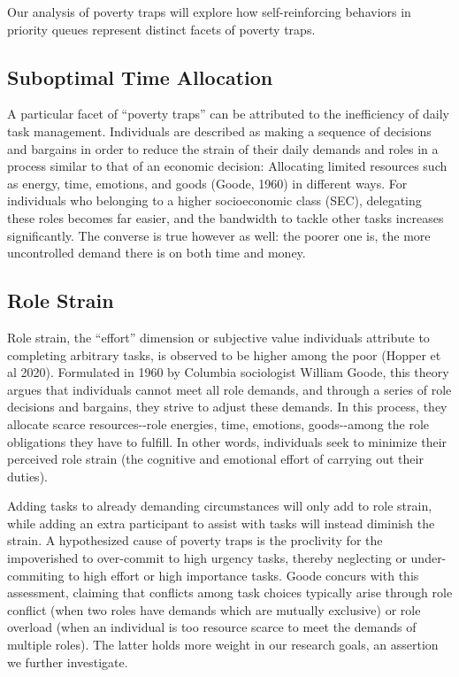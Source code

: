 \documentclass[
]{report}
\begin{document}
Our analysis of poverty traps will explore how self-reinforcing
behaviors in priority queues represent distinct facets of poverty traps.

\hypertarget{suboptimal-time-allocation}{%
\subsection{Suboptimal Time
Allocation}\label{suboptimal-time-allocation}}

A particular facet of ``poverty traps'' can be attributed to the
inefficiency of daily task management. Individuals are described as
making a sequence of decisions and bargains in order to reduce the
strain of their daily demands and roles in a process similar to that of
an economic decision: Allocating limited resources such as energy, time,
emotions, and goods (Goode, 1960) in different ways. For individuals who
belonging to a higher socioeconomic class (SEC), delegating these roles
becomes far easier, and the bandwidth to tackle other tasks increases
significantly. The converse is true however as well: the poorer one is,
the more uncontrolled demand there is on both time and money.

\hypertarget{role-strain}{%
\subsection{Role Strain}\label{role-strain}}

Role strain, the ``effort'' dimension or subjective value individuals
attribute to completing arbitrary tasks, is observed to be higher among
the poor (Hopper et al 2020). Formulated in 1960 by Columbia sociologist
William Goode, this theory argues that individuals cannot meet all role
demands, and through a series of role decisions and bargains, they
strive to adjust these demands. In this process, they allocate scarce
resources-\/-role energies, time, emotions, goods-\/-among the role
obligations they have to fulfill. In other words, individuals seek to
minimize their perceived role strain (the cognitive and emotional effort
of carrying out their duties).

Adding tasks to already demanding circumstances will only add to role
strain, while adding an extra participant to assist with tasks will
instead diminish the strain. A hypothesized cause of poverty traps is
the proclivity for the impoverished to over-commit to high urgency
tasks, thereby neglecting or under-commiting to high effort or high
importance tasks. Goode concurs with this assessment, claiming that
conflicts among task choices typically arise through role conflict (when
two roles have demands which are mutually exclusive) or role overload
(when an individual is too resource scarce to meet the demands of
multiple roles). The latter holds more weight in our research goals, an
assertion we further investigate.
\end{document}
